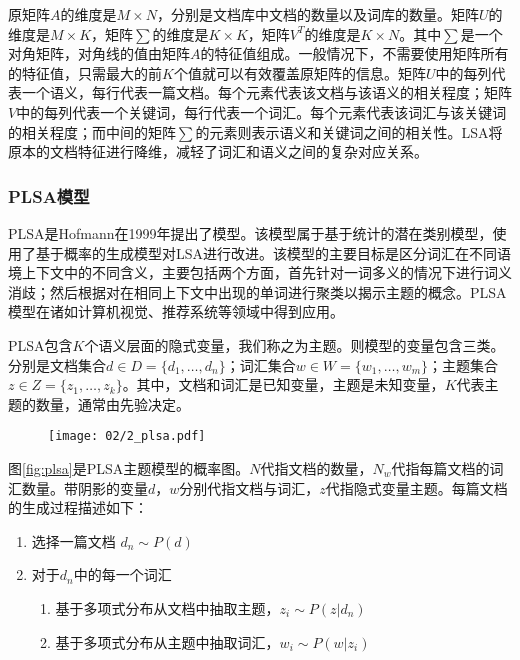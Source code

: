 原矩阵$A$的维度是$M \times N$，分别是文档库中文档的数量以及词库的数量。矩阵$U$的维度是$M \times K$，矩阵$\sum$的维度是$K \times K$，矩阵$V^T$的维度是$K \times N$。其中$\sum$是一个对角矩阵，对角线的值由矩阵$A$的特征值组成。一般情况下，不需要使用矩阵所有的特征值，只需最大的前$K$个值就可以有效覆盖原矩阵的信息。矩阵$U$中的每列代表一个语义，每行代表一篇文档。每个元素代表该文档与该语义的相关程度；矩阵$V$中的每列代表一个关键词，每行代表一个词汇。每个元素代表该词汇与该关键词的相关程度；而中间的矩阵$\sum$的元素则表示语义和关键词之间的相关性。LSA将原本的文档特征进行降维，减轻了词汇和语义之间的复杂对应关系。

\subsubsection{PLSA模型}
PLSA是Hofmann\cite{hofmann1999probabilistic}在1999年提出了模型。该模型属于基于统计的潜在类别模型，使用了基于概率的生成模型对LSA进行改进。该模型的主要目标是区分词汇在不同语境上下文中的不同含义，主要包括两个方面，首先针对一词多义的情况下进行词义消歧；然后根据对在相同上下文中出现的单词进行聚类以揭示主题的概念。PLSA模型在诸如计算机视觉、推荐系统等领域中得到应用。

PLSA包含$K$个语义层面的隐式变量，我们称之为主题。则模型的变量包含三类。分别是文档集合$d \in D = \{d_1, \dots, d_n\}$；词汇集合$w \in W = \{w_1, \dots, w_m\}$；主题集合$z \in Z = \{z_1, \dots, z_k\}$。其中，文档和词汇是已知变量，主题是未知变量，$K$代表主题的数量，通常由先验决定。

\begin{figure}
 \centering
 \texttt{[image: 02/2\_plsa.pdf]}
\end{figure}

图\ref{fig:plsa}是PLSA主题模型的概率图。$N$代指文档的数量，$N_w$代指每篇文档的词汇数量。带阴影的变量$d$，$w$分别代指文档与词汇，$z$代指隐式变量主题。每篇文档的生成过程描述如下：

\begin{enumerate}
\item 选择一篇文档 $d_n \sim P(d)$
\item 对于$d_n$中的每一个词汇
       \begin{enumerate}[fullwidth,itemindent=1em,label=(\alph*)]
       \item 基于多项式分布从文档中抽取主题，$z_i \sim P(z|d_n)$
       \item 基于多项式分布从主题中抽取词汇，$w_i \sim P(w|z_i)$
       \end{enumerate}
\end{enumerate}

